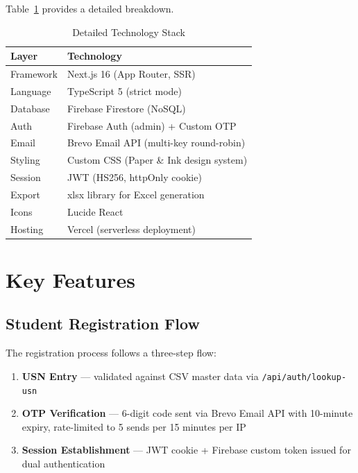 \documentclass[conference]{IEEEtran}
\begin{document}
Table~\ref{tab:techstack} provides a detailed breakdown.

\begin{table}[htbp]
\centering
\caption{Detailed Technology Stack}
\label{tab:techstack}
\footnotesize
\renewcommand{\arraystretch}{1.15}
\begin{tabular}{@{}p{1.4cm}p{5.4cm}@{}}
\toprule
\textbf{Layer} & \textbf{Technology} \\
\midrule
Framework & Next.js 16 (App Router, SSR) \\
Language & TypeScript 5 (strict mode) \\
Database & Firebase Firestore (NoSQL) \\
Auth & Firebase Auth (admin) + Custom OTP \\
Email & Brevo Email API (multi-key round-robin) \\
Styling & Custom CSS (Paper \& Ink design system) \\
Session & JWT (HS256, httpOnly cookie) \\
Export & xlsx library for Excel generation \\
Icons & Lucide React \\
Hosting & Vercel (serverless deployment) \\
\bottomrule
\end{tabular}
\end{table}

\section{Key Features}

\subsection{Student Registration Flow}

The registration process follows a three-step flow:

\begin{enumerate}[noitemsep,topsep=3pt]
    \item \textbf{USN Entry} --- validated against CSV master data via \texttt{/api/auth/lookup-usn}
    \item \textbf{OTP Verification} --- 6-digit code sent via Brevo Email API with 10-minute expiry, rate-limited to 5 sends per 15 minutes per IP
    \item \textbf{Session Establishment} --- JWT cookie + Firebase custom token issued for dual authentication
\end{enumerate}
\end{document}
